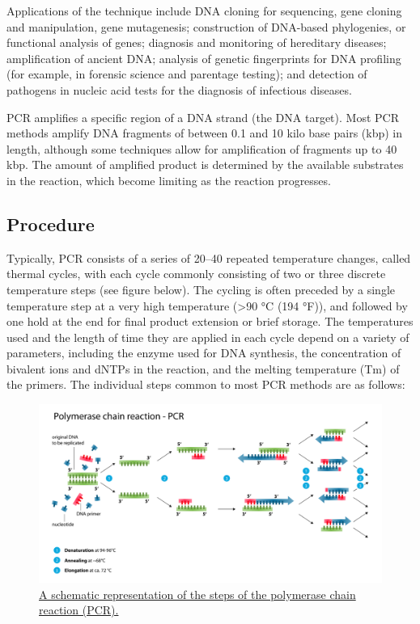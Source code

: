Applications of the technique include DNA cloning for sequencing, gene cloning and manipulation, gene mutagenesis; construction of DNA-based phylogenies, or functional analysis of genes; diagnosis and monitoring of hereditary diseases; amplification of ancient DNA; analysis of genetic fingerprints for DNA profiling (for example, in forensic science and parentage testing); and detection of pathogens in nucleic acid tests for the diagnosis of infectious diseases.

PCR amplifies a specific region of a DNA strand (the DNA target). Most PCR methods amplify DNA fragments of between 0.1 and 10 kilo base pairs (kbp) in length, although some techniques allow for amplification of fragments up to 40 kbp. The amount of amplified product is determined by the available substrates in the reaction, which become limiting as the reaction progresses.

\hypertarget{procedure}{%
\subsection{Procedure}\label{procedure}}

Typically, PCR consists of a series of 20--40 repeated temperature changes, called thermal cycles, with each cycle commonly consisting of two or three discrete temperature steps (see figure below). The cycling is often preceded by a single temperature step at a very high temperature (\textgreater{}90 °C (194 °F)), and followed by one hold at the end for final product extension or brief storage. The temperatures used and the length of time they are applied in each cycle depend on a variety of parameters, including the enzyme used for DNA synthesis, the concentration of bivalent ions and dNTPs in the reaction, and the melting temperature (Tm) of the primers. The individual steps common to most PCR methods are as follows:



\begin{figure}

{\centering \includegraphics[width=0.7\linewidth]{./figures/techniques/Polymerase_chain_reaction} 

}

\caption{\href{https://commons.wikimedia.org/wiki/File:Polymerase_chain_reaction.svg}{A schematic representation of the steps of the polymerase chain reaction (PCR).}}\label{fig:pcrcartoon}
\end{figure}

